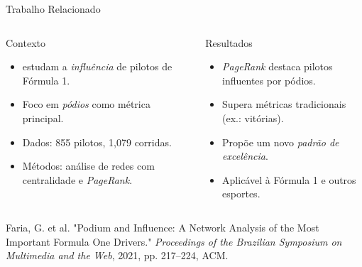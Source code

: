 \begin{frame}{Trabalho Relacionado}
    \begin{columns}[T]
        \begin{block}{Contexto}
            \begin{itemize}
                \item \cite{brasnam2024F1} estudam a \textit{influência} de pilotos de Fórmula 1.
                \item Foco em \textit{pódios} como métrica principal.
                \item Dados: 855 pilotos, 1,079 corridas.
                \item Métodos: análise de redes com centralidade e \textit{PageRank}.
            \end{itemize}
        \end{block}
        
        \begin{block}{Resultados}
            \begin{itemize}
                \item \textit{PageRank} destaca pilotos influentes por pódios.
                \item Supera métricas tradicionais (ex.: vitórias).
                \item Propõe um novo \textit{padrão de excelência}.
                \item Aplicável à Fórmula 1 e outros esportes.
            \end{itemize}
        \end{block}
    \end{columns}
    
    \vspace{0.3cm}
    \small{Faria, G. et al. "Podium and Influence: A Network Analysis of the Most Important Formula One Drivers." \textit{Proceedings of the Brazilian Symposium on Multimedia and the Web}, 2021, pp. 217--224, ACM.}
\end{frame}

